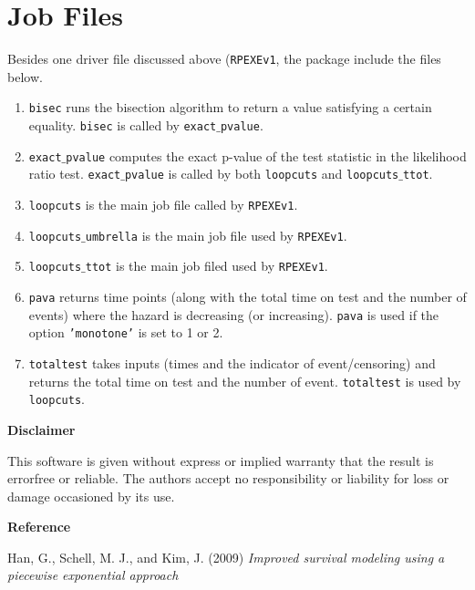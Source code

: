 \documentclass[12pt] {article}
\begin{document}
\section{Job Files}
Besides one driver file discussed above ({\tt RPEXEv1},
the package include the files below.
\begin{enumerate}
\item {\tt bisec} runs the bisection algorithm to return a value satisfying
a certain equality. {\tt bisec} is called by {\tt exact$\_$pvalue}.
\item {\tt exact$\_$pvalue} computes the exact p-value of the test statistic
in the likelihood ratio test. {\tt exact$\_$pvalue} is called by both
{\tt loopcuts} and {\tt loopcuts$\_$ttot}.
\item {\tt loopcuts} is the main job file called by {\tt RPEXEv1}.
\item {\tt loopcuts$\_$umbrella} is the main job file used by {\tt RPEXEv1}.
\item {\tt loopcuts$\_$ttot} is the main job filed used by {\tt RPEXEv1}.
\item {\tt pava} returns time points (along with the total time on test and
the number of events) where the hazard is decreasing (or increasing). {\tt pava}
is used if the option {\tt 'monotone'} is set to 1 or 2.
\item {\tt totaltest} takes inputs (times and the indicator of event/censoring) and
returns the total time on test and the number of event. {\tt totaltest} is used
by {\tt loopcuts}.
\end{enumerate}

\begin{center}
{\bf Disclaimer}
\end{center}
This software is given without express or implied
warranty that the result is errorfree or reliable.
The authors accept no responsibility or liability
for loss or damage occasioned by its use.

\begin{center}
{\bf Reference}
\end{center}
\noindent
Han, G., Schell, M. J., and Kim, J. (2009) {\em Improved survival modeling using
a piecewise exponential approach}
\end{document}
